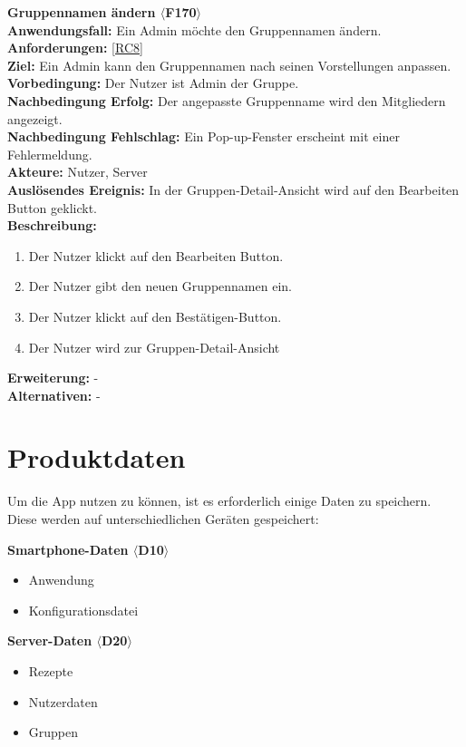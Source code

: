 \documentclass[parskip=full]{scrartcl}
\begin{document}
\textbf{Gruppennamen ändern $\langle$F170$\rangle$}\\
\textbf{Anwendungsfall:} Ein Admin möchte den Gruppennamen ändern.\\
\textbf{Anforderungen:} \ref{RC8}\\
\textbf{Ziel:} Ein Admin kann den Gruppennamen nach seinen Vorstellungen anpassen.\\
\textbf{Vorbedingung:} Der Nutzer ist Admin der Gruppe.\\
\textbf{Nachbedingung Erfolg:} Der angepasste Gruppenname wird den Mitgliedern angezeigt.\\
\textbf{Nachbedingung Fehlschlag:} Ein Pop-up-Fenster erscheint mit einer Fehlermeldung.\\
\textbf{Akteure:} Nutzer, Server \\
\textbf{Auslösendes Ereignis:} In der Gruppen-Detail-Ansicht wird auf den Bearbeiten Button geklickt.\\
\textbf{Beschreibung:}
\begin{enumerate}
    \item Der Nutzer klickt auf den Bearbeiten Button.
    \item Der Nutzer gibt den neuen Gruppennamen ein.
    \item Der Nutzer klickt auf den Bestätigen-Button.
    \item Der Nutzer wird zur Gruppen-Detail-Ansicht
\end{enumerate}
\textbf{Erweiterung:} -\\
\textbf{Alternativen:} -\\
\newpage

\section{Produktdaten}
Um die App nutzen zu können, ist es erforderlich einige Daten zu speichern. Diese werden auf unterschiedlichen Geräten gespeichert:

\textbf{Smartphone-Daten $\langle$D10$\rangle$}
\begin{itemize}
    \item Anwendung
    \item Konfigurationsdatei
\end{itemize}

\textbf{Server-Daten $\langle$D20$\rangle$}
\begin{itemize}
    \item Rezepte
    \item Nutzerdaten
    \item Gruppen
\end{itemize}
\end{document}
